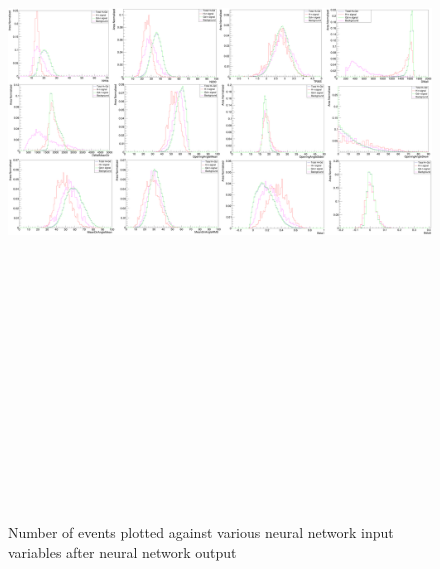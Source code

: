 \begin{landscape}
    \begin{figure}[t]
        \centering
        \hbox{\hspace{-0.5em}\includegraphics[width=24cm,height=21cm,keepaspectratio]{Figures/postNNvariablesbkg.PNG}}
        \caption{Number of events plotted against various neural network input variables after neural network output}
        \label{fig:post_NN_signal}
    \end{figure}
\end{landscape}



